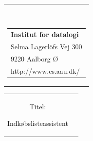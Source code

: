


% 

\begin{nopagebreak}
{\samepage
\begin{flushleft}
\begin{tabular}{r}
\parbox{\textwidth}{  
\hfill
\\
\parbox{8cm}{\begin{tabular}{l}
{\small \textbf{Institut for datalogi}}\\
{\small Selma Lagerlöfs Vej 300} \\
{\small 9220 Aalborg Ø} \\
{\small http://www.cs.aau.dk/}
\end{tabular}}}

\end{tabular}

\end{flushleft}

\begin{tabular}{cc}
\parbox{7cm}{
\begin{description}

\item {Titel:} 

Indkøbslisteassistent

\end{description}

\parbox{8cm}{

}}
\end{tabular}}
\end{nopagebreak}
